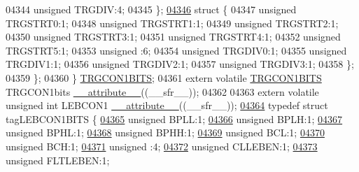 \begin{DoxyCode}
04344       \textcolor{keywordtype}{unsigned} TRGDIV:4;
04345     \};
\hypertarget{a00009_source_l04346}{}\hyperlink{a00009}{04346}     \textcolor{keyword}{struct }\{
04347       \textcolor{keywordtype}{unsigned} TRGSTRT0:1;
04348       \textcolor{keywordtype}{unsigned} TRGSTRT1:1;
04349       \textcolor{keywordtype}{unsigned} TRGSTRT2:1;
04350       \textcolor{keywordtype}{unsigned} TRGSTRT3:1;
04351       \textcolor{keywordtype}{unsigned} TRGSTRT4:1;
04352       \textcolor{keywordtype}{unsigned} TRGSTRT5:1;
04353       \textcolor{keywordtype}{unsigned} :6;
04354       \textcolor{keywordtype}{unsigned} TRGDIV0:1;
04355       \textcolor{keywordtype}{unsigned} TRGDIV1:1;
04356       \textcolor{keywordtype}{unsigned} TRGDIV2:1;
04357       \textcolor{keywordtype}{unsigned} TRGDIV3:1;
04358     \};
04359   \};
04360 \} \hyperlink{a00008_d1/dd1/a00804}{TRGCON1BITS};
04361 \textcolor{keyword}{extern} \textcolor{keyword}{volatile} \hyperlink{a00008_d1/dd1/a00804}{TRGCON1BITS} TRGCON1bits \hyperlink{a00009_a493c46f03454991ccc5aa7a6e1dfb2a7}{\_\_attribute\_\_}((\_\_sfr\_\_));
04362 
04363 \textcolor{keyword}{extern} \textcolor{keyword}{volatile} \textcolor{keywordtype}{unsigned} \textcolor{keywordtype}{int}  LEBCON1 \hyperlink{a00009_a493c46f03454991ccc5aa7a6e1dfb2a7}{\_\_attribute\_\_}((\_\_sfr\_\_));
\hypertarget{a00009_source_l04364}{}\hyperlink{a00008}{04364} \textcolor{keyword}{typedef} \textcolor{keyword}{struct }tagLEBCON1BITS \{
\hypertarget{a00009_source_l04365}{}\hyperlink{a00008_a734b807d032fa494468c04783b84279d}{04365}   \textcolor{keywordtype}{unsigned} BPLL:1;
\hypertarget{a00009_source_l04366}{}\hyperlink{a00008_ab92bd28ed3161199870cae9dca9d8264}{04366}   \textcolor{keywordtype}{unsigned} BPLH:1;
\hypertarget{a00009_source_l04367}{}\hyperlink{a00008_ab1b78e048d280a836358a465b1670e7a}{04367}   \textcolor{keywordtype}{unsigned} BPHL:1;
\hypertarget{a00009_source_l04368}{}\hyperlink{a00008_a8fd804263987e931f779f124751138e1}{04368}   \textcolor{keywordtype}{unsigned} BPHH:1;
\hypertarget{a00009_source_l04369}{}\hyperlink{a00008_acead45594aa9d4a55a37f37fdcc3f0a0}{04369}   \textcolor{keywordtype}{unsigned} BCL:1;
\hypertarget{a00009_source_l04370}{}\hyperlink{a00008_a485d688549b456635ec3ac860ad7cdaf}{04370}   \textcolor{keywordtype}{unsigned} BCH:1;
\hypertarget{a00009_source_l04371}{}\hyperlink{a00008_adf71f3d8410c1f1dbbc96680a92c49af}{04371}   \textcolor{keywordtype}{unsigned} :4;
\hypertarget{a00009_source_l04372}{}\hyperlink{a00008_a4ec62ac7ec38a6cf1ca2276db69912a9}{04372}   \textcolor{keywordtype}{unsigned} CLLEBEN:1;
\hypertarget{a00009_source_l04373}{}\hyperlink{a00008_aa96ca2430a7a6200927f390d1aa0b21a}{04373}   \textcolor{keywordtype}{unsigned} FLTLEBEN:1;

\end{DoxyCode}
